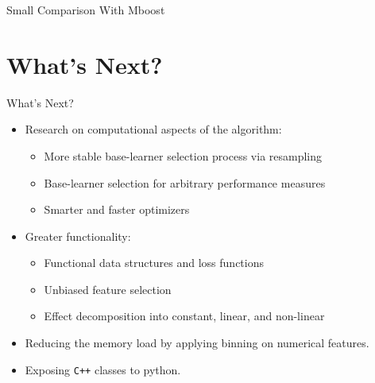 \documentclass[10pt]{beamer}\usepackage[]{graphicx}\usepackage[]{color}
\begin{document}
\begin{frame}{Small Comparison With Mboost}
\end{frame}


\section{What's Next?}

\begin{frame}{What's Next?}

\begin{itemize}
  \item
    Research on computational aspects of the algorithm:
    \begin{itemize}
      \item
        More stable base-learner selection process via resampling
      \item
        Base-learner selection for arbitrary performance measures
      \item
        Smarter and faster optimizers
    \end{itemize}

  \item
    Greater functionality:
    \begin{itemize}
      \item
        Functional data structures and loss functions
      \item
        Unbiased feature selection
      \item
        Effect decomposition into constant, linear, and non-linear
    \end{itemize}

    \item
      Reducing the memory load by applying binning on numerical features.

    \item
      Exposing \texttt{C++} classes to python.
\end{itemize}

\end{frame}

\addtocounter{framenumber}{-1}
\end{document}
